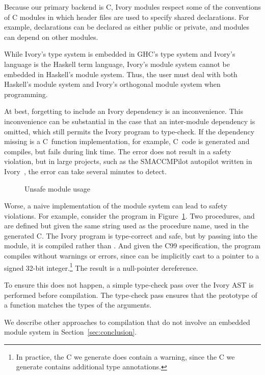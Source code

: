 Because our primary backend is C, Ivory modules respect some of the conventions
of C modules in which header files are used to specify shared declarations. For
example, declarations can be declared as either public or private, and modules
can depend on other modules.

While Ivory's type system is embedded in GHC's type system and Ivory's language
is the Haskell term language, Ivory's module system cannot be embedded in
Haskell's module system. Thus, the user must deal with both Haskell's module
system and Ivory's orthogonal module system when programming.

At best, forgetting to include an Ivory dependency is an inconvenience. This
inconvenience can be substantial in the case that an inter-module dependency is
omitted, which still permits the Ivory program to type-check. If the dependency
missing is a C~function implementation, for example, C~code is generated and
compiles, but fails during link time. The error does not result in a safety
violation, but in large projects, such as the SMACCMPilot autopilot written in
Ivory~\cite{}, the error can take several minutes to detect.

\begin{figure}[h]
\caption{Unsafe module usage}
\label{fig:unsafe-module}
\end{figure}

Worse, a naive implementation of the module system can lead to safety
violations. For example, consider the program in
Figure~\ref{fig:unsafe-module}. Two procedures,  and 
are defined but given the same string used as the procedure name, used in the
generated C. The Ivory program is type-correct and safe, but by passing
 into the module, it is compiled rather than . And given
the C99 specification, the program compiles without warnings or errors, since
 can be implicitly cast to a pointer to a signed 32-bit
integer.\footnote{In practice, the C we generate does contain a warning, since
  the C we generate contains additional type annotations.} The result is a
null-pointer dereference.

To ensure this does not happen, a simple type-check pass over the Ivory AST is
performed before compilation. The type-check pass ensures that the prototype of
a function matches the types of the arguments.

We describe other approaches to compilation that do not involve an embedded
module system in Section~\ref{sec:conclusion}.
